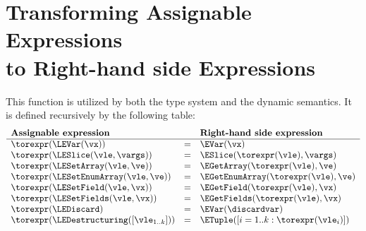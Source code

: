 \section{Transforming Assignable Expressions \\ to Right-hand side Expressions\label{sec:LeftToRight}}
This function is utilized by both the type system and the dynamic semantics.
It is defined recursively by the following table:
\[
\begin{array}{lcl}
  \textbf{Assignable expression} & & \textbf{Right-hand side expression}\\
  \hline
  \torexpr(\LEVar(\vx)) &=& \EVar(\vx)\\
  \torexpr(\LESlice(\vle, \vargs)) &=& \ESlice(\torexpr(\vle), \vargs)\\
  \torexpr(\LESetArray(\vle, \ve)) &=& \EGetArray(\torexpr(\vle), \ve)\\
  \torexpr(\LESetEnumArray(\vle, \ve)) &=& \EGetEnumArray(\torexpr(\vle), \ve)\\
  \torexpr(\LESetField(\vle, \vx)) &=& \EGetField(\torexpr(\vle), \vx)\\
  \torexpr(\LESetFields(\vle, \vx)) &=& \EGetFields(\torexpr(\vle), \vx)\\
  \torexpr(\LEDiscard) &=& \EVar(\discardvar)\\
  \torexpr(\LEDestructuring([\vle_{1..k}])) &=& \ETuple([i=1..k: \torexpr(\vle_i)])\\
\end{array}
\]

